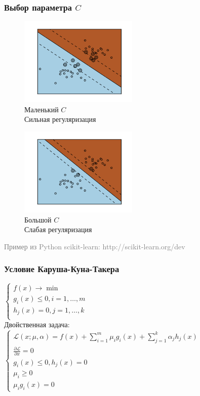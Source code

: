 \documentclass[12pt]{beamer}
\begin{document}
\begin{frame}\frametitle{Выбор параметра $C$}
\begin{figure}[htbp]
	\begin{minipage}{.5\textwidth}
	  \includegraphics[height=120pt, keepaspectratio = true]{images/svm_reg} \\
		\centering Маленький $C$\\ Сильная регуляризация\\
    \end{minipage}%
    \begin{minipage}{.5\textwidth}
		\includegraphics[height=120pt, keepaspectratio = true]{images/svm_non_reg}   \\
	  \centering Большой $C$\\ Слабая регуляризация\\
	\end{minipage}%
\end{figure}
\textcolor{gray}{Пример из Python scikit-learn: http://scikit-learn.org/dev}
\end{frame}

\begin{frame}\frametitle{Условие Каруша-Куна-Такера}
$\begin{cases}
f(x) \rightarrow \min\\
g_i(x) \leq 0 , i = 1, \dots, m\\
h_j(x) = 0 , j = 1, \dots, k\\
\end{cases}$\\
\vspace{5mm}
Двойственная задача:\\
$\begin{cases}
\mathcal{L}(x; \mu, \alpha) = f(x) + \sum\limits_{i = 1}^m \mu_ig_i(x) + \sum\limits_{j = 1}^k \alpha_jh_j(x)\\
\frac{\partial \mathcal{L}}{\partial x} = 0\\
g_i(x) \leq 0 , h_j(x) = 0\\
\mu_i \geq 0\\
\mu_ig_i(x) = 0
\end{cases}$\\

\end{frame}
\end{document}

